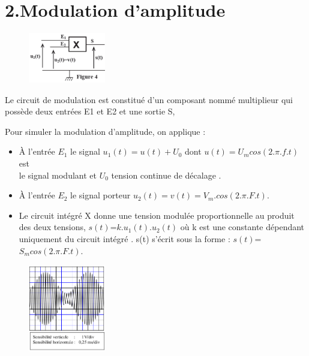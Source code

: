 \documentclass[12pt]{article}
\begin{document}
\section*{2.Modulation d’amplitude \dotfill }

\begin{figure}
	\vspace{-1.2cm}
\begin{center}
  \includegraphics[width=0.3\textwidth]{./ex_033.png}
\end{center}
\end{figure}



Le circuit de modulation est constitué d’un composant nommé multiplieur
qui possède deux entrées E1 et E2 et une sortie S,

Pour simuler la modulation d’amplitude, on applique :
\begin{itemize}

	\item À l’entrée $E_1$ le signal $u_1(t)=u(t)+U_0$ dont $u(t)=U_mcos(2.\pi.f.t)$ est\\ le
signal modulant et $U_0$ tension continue de décalage .
\item À l’entrée $E_2$ le signal porteur $u_2(t)=v(t)=V_m.cos(2.\pi.F.t)$.
\item Le circuit intégré X donne une tension modulée proportionnelle
au produit des deux tensions, $s(t)$=$ k.u_1(t).u_2(t)$ où k est une
constante dépendant uniquement du circuit intégré . s(t) s’écrit
sous la forme : $s(t)$=$S_mcos(2.\pi.F.t)$.
\end{itemize}

\begin{figure}
	\vspace{-3.5cm}

\begin{center}
  \includegraphics[width=0.3\textwidth]{./ex_034.png}
\end{center}
\end{figure}
\end{document}
